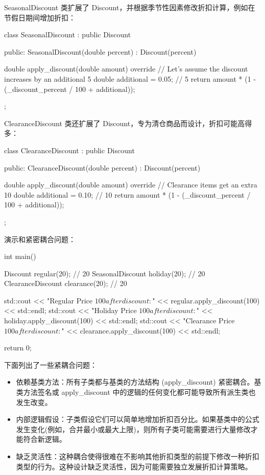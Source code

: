 SeasonalDiscount 类扩展了 Discount，并根据季节性因素修改折扣计算，例如在节假日期间增加折扣：

\begin{cpp}
class SeasonalDiscount : public Discount {
public:
    SeasonalDiscount(double percent) : Discount(percent) {}

    double apply_discount(double amount) override {
        // Let's assume the discount increases by an additional 5%
        double additional = 0.05; // 5%
        return amount * (1 - (_discount_percent / 100 + additional));
    }
};
\end{cpp}


ClearanceDiscount 类还扩展了 Discount，专为清仓商品而设计，折扣可能高得多：

\begin{cpp}
class ClearanceDiscount : public Discount {
public:
    ClearanceDiscount(double percent) : Discount(percent) {}

    double apply_discount(double amount) override {
        // Clearance items get an extra 10%
        double additional = 0.10; // 10%
        return amount * (1 - (_discount_percent / 100 + additional));
    }
};
\end{cpp}

演示和紧密耦合问题：

\begin{cpp}
int main() {
    Discount regular(20); // 20%
    SeasonalDiscount holiday(20); // 20%
    ClearanceDiscount clearance(20); // 20%

    std::cout << "Regular Price $100 after discount: $" << regular.apply_discount(100) << std::endl;
    std::cout << "Holiday Price $100 after discount: $" << holiday.apply_discount(100) << std::endl;
    std::cout << "Clearance Price $100 after discount: $" << clearance.apply_discount(100) << std::endl;

    return 0;
}
\end{cpp}


下面列出了一些紧耦合问题：

\begin{itemize}
\item
依赖基类方法：所有子类都与基类的方法结构 (apply\_discount) 紧密耦合。基类方法签名或 apply\_discount 中的逻辑的任何变化都可能导致所有派生类也发生改变。

\item
内部逻辑假设：子类假设它们可以简单地增加折扣百分比。如果基类中的公式发生变化(例如，合并最小或最大上限)，则所有子类可能需要进行大量修改才能符合新逻辑。

\item
缺乏灵活性：这种耦合使得很难在不影响其他折扣类型的前提下修改一种折扣类型的行为。这种设计缺乏灵活性，因为可能需要独立发展折扣计算策略。
\end{itemize}

